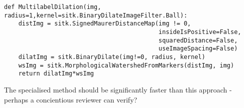 \documentclass{InsightArticle}
\begin{document}
\lstset{language=Python}
\begin{lstlisting}
def MultilabelDilation(img, radius=1,kernel=sitk.BinaryDilateImageFilter.Ball):
    distImg = sitk.SignedMaurerDistanceMap(img != 0,
                                           insideIsPositive=False, 
                                           squaredDistance=False, 
                                           useImageSpacing=False)
    dilatImg = sitk.BinaryDilate(img!=0, radius, kernel)
    wsImg = sitk.MorphologicalWatershedFromMarkers(distImg, img)
    return dilatImg*wsImg
\end{lstlisting}

The specialised method should be significantly faster than this approach - perhaps a concientious reviewer can verify?



\nocite{ITKSoftwareGuide}
\end{document}
